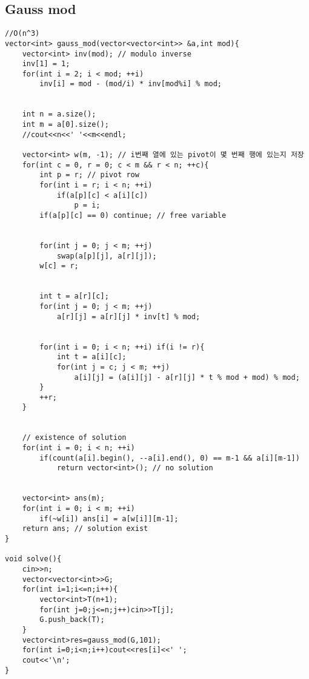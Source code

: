 \documentclass[landscape, 8pt, a4paper, oneside, twocolumn]{extarticle}
\begin{document}
\subsection{Gauss mod}
\begin{verbatim}
//O(n^3)
vector<int> gauss_mod(vector<vector<int>> &a,int mod){
    vector<int> inv(mod); // modulo inverse
    inv[1] = 1;
    for(int i = 2; i < mod; ++i)
        inv[i] = mod - (mod/i) * inv[mod%i] % mod;


    int n = a.size();
    int m = a[0].size();
	//cout<<n<<' '<<m<<endl;

    vector<int> w(m, -1); // i번째 열에 있는 pivot이 몇 번째 행에 있는지 저장
    for(int c = 0, r = 0; c < m && r < n; ++c){
        int p = r; // pivot row
        for(int i = r; i < n; ++i)
            if(a[p][c] < a[i][c])
                p = i;
        if(a[p][c] == 0) continue; // free variable


        for(int j = 0; j < m; ++j)
            swap(a[p][j], a[r][j]);
        w[c] = r;


        int t = a[r][c];
        for(int j = 0; j < m; ++j)
            a[r][j] = a[r][j] * inv[t] % mod;


        for(int i = 0; i < n; ++i) if(i != r){
            int t = a[i][c];
            for(int j = c; j < m; ++j)
                a[i][j] = (a[i][j] - a[r][j] * t % mod + mod) % mod;
        }
        ++r;
    }


    // existence of solution
    for(int i = 0; i < n; ++i)
        if(count(a[i].begin(), --a[i].end(), 0) == m-1 && a[i][m-1])
            return vector<int>(); // no solution


    vector<int> ans(m);
    for(int i = 0; i < m; ++i)
        if(~w[i]) ans[i] = a[w[i]][m-1];
    return ans; // solution exist
}

void solve(){
	cin>>n;
	vector<vector<int>>G;
	for(int i=1;i<=n;i++){
		vector<int>T(n+1);
		for(int j=0;j<=n;j++)cin>>T[j];
		G.push_back(T);
	}
	vector<int>res=gauss_mod(G,101);
	for(int i=0;i<n;i++)cout<<res[i]<<' ';
	cout<<'\n';
}
\end{verbatim}
\newpage
\end{document}
